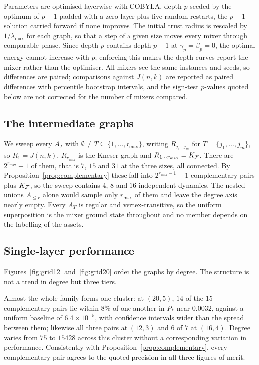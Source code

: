 Parameters are optimised layerwise with COBYLA, depth $p$ seeded by the optimum of $p-1$ padded with a zero layer plus five random restarts, the $p-1$ solution carried forward if none improves. The initial trust radius is rescaled by $1/\lambda_{\max}$ for each graph, so that a step of a given size moves every mixer through comparable phase.
Since depth $p$ contains depth $p-1$ at $\gamma_p=\beta_p=0$, the optimal energy cannot increase with $p$; enforcing this makes the depth curves report the mixer rather than the optimiser. All mixers see the same instances and seeds, so differences are paired; comparisons against $J(n,k)$ are reported as paired differences with percentile bootstrap intervals, and the sign-test $p$-values quoted below are not corrected for the number of mixers compared.

\subsection{\label{sec:intermediate}The intermediate graphs}
We sweep every $A_T$ with $\emptyset\neq T\subseteq\{1,\dots,r_{\max}\}$, writing $R_{j_1\cdots j_m}$ for $T=\{j_1,\dots,j_m\}$, so $R_1=J(n,k)$, $R_{r_{\max}}$ is the Kneser graph and $R_{1\cdots r_{\max}}=K_{\mathcal{F}}$. There are $2^{r_{\max}}-1$ of them, that is $7$, $15$ and $31$ at the three sizes, all connected. By Proposition~\ref{prop:complementary} these fall into $2^{r_{\max}-1}-1$ complementary pairs plus $K_{\mathcal{F}}$, so the sweep contains $4$, $8$ and $16$ independent dynamics. The nested unions $A_{\le r}$ alone would sample only $r_{\max}$ of them and leave the degree axis nearly empty. Every $A_T$ is regular and vertex-transitive, so the uniform superposition is the mixer ground state throughout and no member depends on the labelling of the assets.

\subsection{\label{sec:p1}Single-layer performance}
Figures~\ref{fig:grid12} and~\ref{fig:grid20} order the graphs by degree. The structure is not a trend in degree but three tiers.

Almost the whole family forms one cluster: at $(20,5)$, $14$ of the $15$ complementary pairs lie within $8\%$ of one another in $P_*$ near $0.0032$, against a uniform baseline of $6.4\times10^{-5}$, with confidence intervals wider than the spread between them; likewise all three pairs at $(12,3)$ and $6$ of $7$ at $(16,4)$. Degree varies from $75$ to $15428$ across this cluster without a corresponding variation in performance. Consistently with Proposition~\ref{prop:complementary}, every complementary pair agrees to the quoted precision in all three figures of merit.

